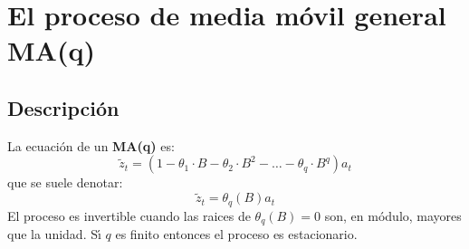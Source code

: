 %
%

\section{El proceso de media m\'ovil general MA(q)}

\subsection{Descripci\'on}

La ecuaci\'on de un \textbf{MA(q)} es:
\begin{displaymath}
\widetilde{z}_t=(1-\theta_1\cdot B-\theta_2\cdot B^2-\dots -\theta_q\cdot B^q)
a_t
\end{displaymath}
que se suele denotar:
\begin{equation}\label{eq:MA(q)}
\widetilde{z}_t = \theta_q(B)a_t
\end{equation}
El proceso es invertible cuando las raices de $\theta_q(B)=0$ son, en m\'odulo,
mayores que la unidad. S\'{\i} $q$ es finito entonces el proceso es
estacionario.
